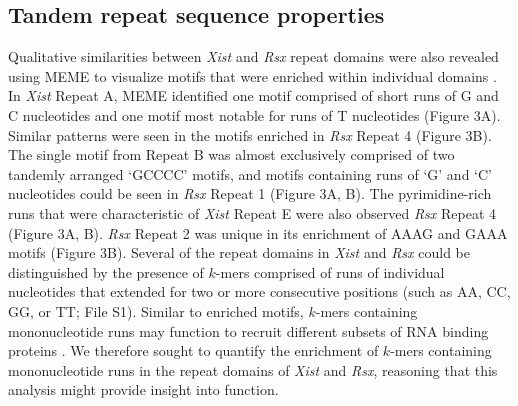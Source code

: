 \subsection{Tandem repeat sequence properties}
Qualitative similarities between \emph{Xist} and \emph{Rsx} repeat domains were also revealed using MEME to visualize motifs that were enriched within individual domains \cite{Bailey2009MEMESearching}. In \emph{Xist} Repeat A, MEME identified one motif comprised of short runs of G and C nucleotides and one motif most notable for runs of T nucleotides (Figure 3A). Similar patterns were seen in the motifs enriched in \emph{Rsx} Repeat 4 (Figure 3B). The single motif from Repeat B was almost exclusively comprised of two tandemly arranged ‘GCCCC’ motifs, and motifs containing runs of ‘G’ and ‘C’ nucleotides could be seen in \emph{Rsx} Repeat 1 (Figure 3A, B). The pyrimidine-rich runs that were characteristic of \emph{Xist} Repeat E were also observed \emph{Rsx} Repeat 4 (Figure 3A, B). \emph{Rsx} Repeat 2 was unique in its enrichment of AAAG and GAAA motifs (Figure 3B).
Several of the repeat domains in \emph{Xist} and \emph{Rsx} could be distinguished by the presence of $k$-mers comprised of runs of individual nucleotides that extended for two or more consecutive positions (such as AA, CC, GG, or TT; File S1). Similar to enriched motifs, $k$-mers containing mononucleotide runs may function to recruit different subsets of RNA binding proteins \cite{Dominguez2018SequenceProteins,Ray2013ARegulation}. We therefore sought to quantify the enrichment of $k$-mers containing mononucleotide runs in the repeat domains of \emph{Xist} and \emph{Rsx}, reasoning that this analysis might provide insight into function. 
